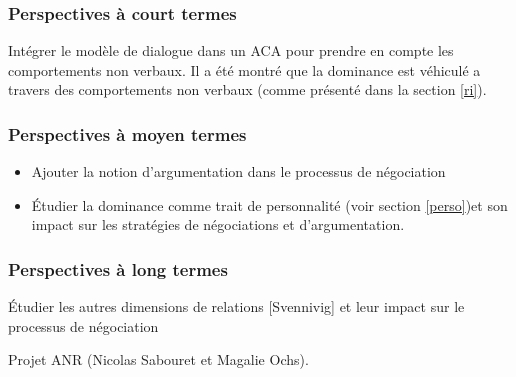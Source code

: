 \documentclass [french]{article}
\begin{document}
			\subsubsection{Perspectives à court termes}
				Intégrer le modèle de dialogue dans un ACA pour prendre en compte les comportements non verbaux. Il a été montré que la dominance est véhiculé a travers des comportements non verbaux (comme présenté dans la section \ref{ri}).
			
			\subsubsection{Perspectives à moyen termes}
			\begin{itemize}
				\item	Ajouter la notion d'argumentation dans le processus de négociation
				\item	Étudier la dominance comme trait de personnalité (voir section \ref{perso})et son impact sur les stratégies de négociations et d'argumentation.

			\end{itemize}

			\subsubsection{Perspectives à long termes}
				Étudier les autres dimensions de relations [Svennivig] et leur impact sur le processus de négociation
				
				Projet ANR (Nicolas Sabouret et Magalie Ochs).
\end{document}
